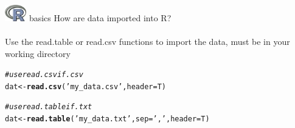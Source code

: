 \documentclass[xcolor=svgnames]{beamer}\usepackage[]{graphicx}\usepackage[]{color}
\makeatletter
\newcommand{\hlstr}[1]{\textcolor[rgb]{0.192,0.494,0.8}{#1}}%
\newcommand{\hlcom}[1]{\textcolor[rgb]{0.678,0.584,0.686}{\textit{#1}}}%
\newcommand{\hlstd}[1]{\textcolor[rgb]{0.345,0.345,0.345}{#1}}%
\newcommand{\hlkwb}[1]{\textcolor[rgb]{0.69,0.353,0.396}{#1}}%
\newcommand{\hlkwc}[1]{\textcolor[rgb]{0.333,0.667,0.333}{#1}}%
\newcommand{\hlkwd}[1]{\textcolor[rgb]{0.737,0.353,0.396}{\textbf{#1}}}%
\newenvironment{kframe}{%
 \def\at@end@of@kframe{}%
 \ifinner\ifhmode%
  \def\at@end@of@kframe{\end{minipage}}%
  \begin{minipage}{\columnwidth}%
 \fi\fi%
 \def\FrameCommand##1{\hskip\@totalleftmargin \hskip-\fboxsep
 \colorbox{shadecolor}{##1}\hskip-\fboxsep
     \hskip-\linewidth \hskip-\@totalleftmargin \hskip\columnwidth}%
 \MakeFramed {\advance\hsize-\width
   \@totalleftmargin\z@ \linewidth\hsize
   \@setminipage}}%
 {\par\unskip\endMakeFramed%
 \at@end@of@kframe}
\newenvironment{knitrout}{}{} %
\makeatother
\begin{document}
\begin{frame}[t,fragile]{\includegraphics[width=0.07\textwidth]{Rlogo.jpg} \hspace{0.01in} basics}
How are data imported into R?\\~\\
Use the read.table or read.csv functions to import the data, must be in your working directory
\begin{knitrout}
\color{fgcolor}\begin{kframe}
\begin{alltt}
\hlcom{# use read.csv if .csv}
\hlstd{dat} \hlkwb{<-} \hlkwd{read.csv}\hlstd{(}\hlstr{'my_data.csv'}\hlstd{,} \hlkwc{header} \hlstd{= T)}

\hlcom{# use read.table if .txt}
\hlstd{dat} \hlkwb{<-} \hlkwd{read.table}\hlstd{(}\hlstr{'my_data.txt'}\hlstd{,} \hlkwc{sep} \hlstd{=} \hlstr{','}\hlstd{,} \hlkwc{header} \hlstd{= T)}
\end{alltt}
\end{kframe}
\end{knitrout}
\end{frame}
\end{document}
